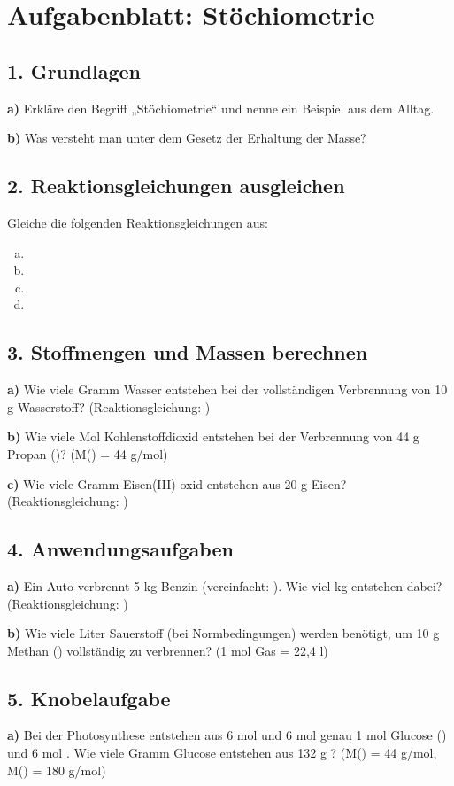 
\section*{Aufgabenblatt: Stöchiometrie}

\subsection*{1. Grundlagen}
\textbf{a)} Erkläre den Begriff „Stöchiometrie“ und nenne ein Beispiel aus dem Alltag.

\textbf{b)} Was versteht man unter dem Gesetz der Erhaltung der Masse?

\subsection*{2. Reaktionsgleichungen ausgleichen}
Gleiche die folgenden Reaktionsgleichungen aus:
\begin{enumerate}[a)]
    \item {}
    \item {}
    \item {}
    \item {}
\end{enumerate}

\subsection*{3. Stoffmengen und Massen berechnen}
\textbf{a)} Wie viele Gramm Wasser entstehen bei der vollständigen Verbrennung von 10 g Wasserstoff? (Reaktionsgleichung: )

\textbf{b)} Wie viele Mol Kohlenstoffdioxid entstehen bei der Verbrennung von 44 g Propan ()? (M() = 44 g/mol)

\textbf{c)} Wie viele Gramm Eisen(III)-oxid entstehen aus 20 g Eisen? (Reaktionsgleichung: )

\subsection*{4. Anwendungsaufgaben}
\textbf{a)} Ein Auto verbrennt 5 kg Benzin (vereinfacht: ). Wie viel kg  entstehen dabei? (Reaktionsgleichung: )

\textbf{b)} Wie viele Liter Sauerstoff (bei Normbedingungen) werden benötigt, um 10 g Methan () vollständig zu verbrennen? (1 mol Gas = 22{,}4 l)

\subsection*{5. Knobelaufgabe}
\textbf{a)} Bei der Photosynthese entstehen aus 6 mol  und 6 mol  genau 1 mol Glucose () und 6 mol . Wie viele Gramm Glucose entstehen aus 132 g ? (M() = 44 g/mol, M() = 180 g/mol)

